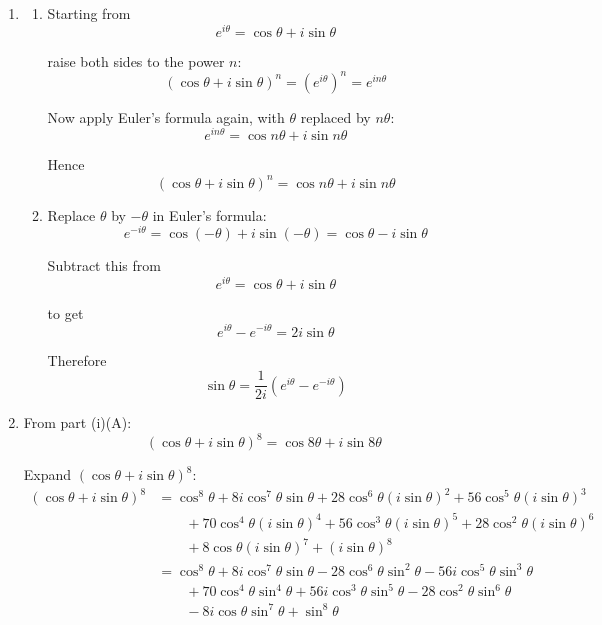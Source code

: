\documentclass[leqno]{article}
\begin{document}
\begin{enumerate}[
  label=\textbf{\arabic*.},
  leftmargin=*,
  topsep=0pt,
  partopsep=0pt,
  parsep=0pt
]
\vspace*{10pt}

\begin{djsSolution}
\begin{enumerate}[label=\textbf{(\roman*)}]
  \item
  \begin{enumerate}[label=(\Alph*)]
    \item Starting from
    \[
    e^{i\theta}=\cos\theta+i\sin\theta
    \]

    raise both sides to the power \(n\):
    \[
    \left(\cos\theta+i\sin\theta\right)^n=\left(e^{i\theta}\right)^n=e^{in\theta}
    \]

    Now apply Euler's formula again, with \(\theta\) replaced by \(n\theta\):
    \[
    e^{in\theta}=\cos n\theta+i\sin n\theta
    \]

    Hence
    \[
    \left(\cos\theta+i\sin\theta\right)^n=\cos n\theta+i\sin n\theta
    \]

    \item Replace \(\theta\) by \(-\theta\) in Euler's formula:
    \[
    e^{-i\theta}=\cos(-\theta)+i\sin(-\theta)=\cos\theta-i\sin\theta
    \]

    Subtract this from
    \[
    e^{i\theta}=\cos\theta+i\sin\theta
    \]

    to get
    \[
    e^{i\theta}-e^{-i\theta}=2i\sin\theta
    \]

    Therefore
    \[
    \sin\theta=\frac{1}{2i}\left(e^{i\theta}-e^{-i\theta}\right)
    \]
  \end{enumerate}

  \item From part (i)(A):
  \[
  (\cos\theta+i\sin\theta)^8=\cos 8\theta+i\sin 8\theta
  \]

  Expand \((\cos\theta+i\sin\theta)^8\):
  \begin{align*}
  (\cos\theta+i\sin\theta)^8
  &=\cos^8\theta+8i\cos^7\theta\sin\theta+28\cos^6\theta(i\sin\theta)^2+56\cos^5\theta(i\sin\theta)^3 \\
  &\qquad +70\cos^4\theta(i\sin\theta)^4+56\cos^3\theta(i\sin\theta)^5+28\cos^2\theta(i\sin\theta)^6 \\
  &\qquad +8\cos\theta(i\sin\theta)^7+(i\sin\theta)^8 \\
  &=\cos^8\theta+8i\cos^7\theta\sin\theta-28\cos^6\theta\sin^2\theta-56i\cos^5\theta\sin^3\theta \\
  &\qquad +70\cos^4\theta\sin^4\theta+56i\cos^3\theta\sin^5\theta-28\cos^2\theta\sin^6\theta \\
  &\qquad -8i\cos\theta\sin^7\theta+\sin^8\theta
  \end{align*}


\end{enumerate}
\end{djsSolution}
\end{enumerate}
\end{document}
